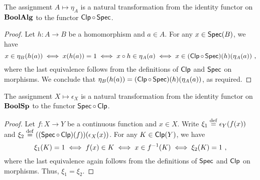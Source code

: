 \documentclass[a4paper,10pt]{article}
\numberwithin{theorem}{section}
\begin{document}
\begin{proposition}\label{etanat}
    The assignment $A \mapsto \eta_A$ is a natural transformation from the
    identity functor on $\mathbf{BoolAlg}$ to the functor $\operatorname*{\mathsf{Clp}} \circ \operatorname*{\mathsf{Spec}}$.
\end{proposition}
\begin{proof}
    Let $h \colon A \to B$ be a homomorphism and $a \in A$. For any $x
    \in \operatorname*{\mathsf{Spec}}(B)$, we have
    \[ x \in \eta_B(h(a)) \iff x(h(a)) = 1 \iff x \circ h \in \eta_A(a) \iff
    x \in (\operatorname*{\mathsf{Clp}} \circ \operatorname*{\mathsf{Spec}})(h)(\eta_A(a)) \ , \]
    where the last equivalence follows from the definitions of $\operatorname*{\mathsf{Clp}}$ and
    $\operatorname*{\mathsf{Spec}}$ on morphisms.
We conclude that
    $\eta_B(h(a)) = (\operatorname*{\mathsf{Clp}} \circ \operatorname*{\mathsf{Spec}})(h)(\eta_A(a))$, as required.
\end{proof}

\begin{proposition}\label{epsilonnat}
    The assignment $X \mapsto \epsilon_X$ is a natural transformation from the
    identity functor on $\mathbf{BoolSp}$ to the functor $\operatorname*{\mathsf{Spec}} \circ \operatorname*{\mathsf{Clp}}$.
\end{proposition}
\begin{proof}
    Let $f \colon X \to Y$ be a continuous function and $x \in X$. Write $\xi_1
    \stackrel{\mathrm{def}}{=} \epsilon_Y(f(x))$ and $\xi_2 \stackrel{\mathrm{def}}{=} ((\operatorname*{\mathsf{Spec}} \circ
    \operatorname*{\mathsf{Clp}})(f))(\epsilon_X(x))$. For any $K \in \operatorname*{\mathsf{Clp}}(Y)$, we have
    \[ \xi_1(K) = 1 \iff f(x) \in K \iff x \in f^{-1}(K) \iff
    \xi_2(K) = 1 \ , \]
    where the last equivalence again follows from the definitions of $\operatorname*{\mathsf{Spec}}$
    and $\operatorname*{\mathsf{Clp}}$ on morphisms. Thus, $\xi_1 = \xi_2$.
\end{proof}
\end{document}
